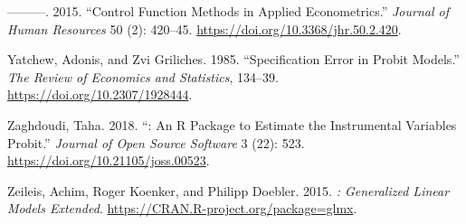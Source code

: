 \begin{CSLReferences}{1}{0}
\leavevmode{}%
---------. 2015. {``{Control Function Methods in Applied Econometrics}.''} \emph{Journal of Human Resources} 50 (2): 420--45. \url{https://doi.org/10.3368/jhr.50.2.420}.

\leavevmode{}%
Yatchew, Adonis, and Zvi Griliches. 1985. {``{Specification Error in Probit Models}.''} \emph{The Review of Economics and Statistics}, 134--39. \url{https://doi.org/10.2307/1928444}.

\leavevmode{}%
Zaghdoudi, Taha. 2018. {``: An {R} Package to Estimate the Instrumental Variables Probit.''} \emph{Journal of Open Source Software} 3 (22): 523. \url{https://doi.org/10.21105/joss.00523}.

\leavevmode{}%
Zeileis, Achim, Roger Koenker, and Philipp Doebler. 2015. \emph{{: Generalized Linear Models Extended}}. \url{https://CRAN.R-project.org/package=glmx}.

\end{CSLReferences}


\address{%
Mauricio Sarrias\\
Universidad de Talca\\%
Facultad de Economía y Negocios (FEN)\\ Universidad de Talca, Talca, Chile\\
%
\url{https://www.msarrias.com}\\%
\textit{ORCiD: \href{https://orcid.org/0000-0001-5932-4817}{0000-0001-5932-4817}}\\%
\href{mailto:mauricio.sarrias@utalca.cl}{\nolinkurl{mauricio.sarrias@utalca.cl}}%
}
